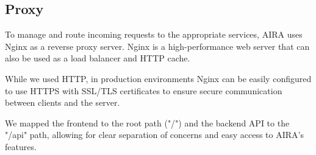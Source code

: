 \subsection{Proxy}
To manage and route incoming requests to the appropriate
services, AIRA uses Nginx as a reverse proxy server.
Nginx is a high-performance web server that can also
be used as a load balancer and HTTP cache.

While we used HTTP, in production environments
Nginx can be easily configured to use HTTPS
with SSL/TLS certificates to ensure secure
communication between clients and the server.

We mapped the frontend to the root path ("/") and
the backend API to the "/api" path, allowing for
clear separation of concerns and easy access to
AIRA's features.
